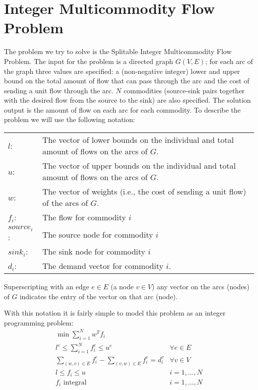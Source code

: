 \documentclass{article}
\begin{document}
\section{Integer Multicommodity Flow Problem}
The problem we try to solve is the Splitable Integer Multicommodity Flow
Problem. The input for the problem is a directed graph $G(V,E)$; for each arc
of the graph three values are specified: a (non-negative integer) lower and
upper bound on the total amount of flow that can pass through the arc and the
cost of sending a unit flow through the arc. $N$ commodities (source-sink
pairs together with the desired flow from the source to the sink) are also
specified. The solution output is the amount of flow on each arc for each
commodity. To describe the problem we will use the following notation:
\begin{center}
\begin{tabular}{lp{3.5in}}
\hline 
$l$: & The vector of lower bounds on the individual and total amount of
flows on the arcs of $G$. \\
$u$: & The vector of upper bounds on the individual and total amount of
flows on the arcs of $G$. \\
$w$: & The vector of weights (i.e., the cost of sending a unit flow) of the
arcs of $G$. \\
$f_i$: & The flow for commodity $i$ \\ 
$\textit{source}_i$: & The source node for commodity $i$ \\ 
$\textit{sink}_i$: & The sink node for commodity $i$ \\ 
$d_i$: & The demand vector for commodity $i$. \\
\hline
\end{tabular}
\end{center}
Superscripting with an edge $e \in E$ (a node $v \in V$) any vector on the
arcs (nodes) of $G$ indicates the entry of the vector on that arc (node).

With this notation it is fairly simple to model this problem as an integer
programming problem:
\begin{eqnarray}[r:l]
\min\sum_{i=1}^Nw^Tf_i
& \nonumber \\
l^e \le \sum_{i=1}^Nf^e_i \le u^e 
& \forall e\in E \label{cap-total}\\
\sum_{(w,v)\in E}f^e_i - \sum_{(v,w)\in E}f^e_i = d^v_i 
& \forall v\in V \label{flow-conv}\\
l \le f_i \le u 
& i=1,...,N \label{cap-edge}\\
f_i \textrm{\ integral} 
& i=1,...,N
\end{eqnarray}
\end{document}
